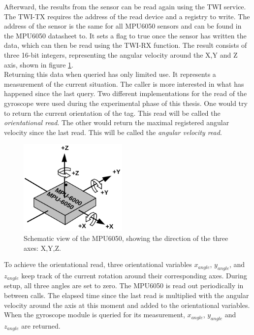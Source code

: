 Afterward, the results from the sensor can be read again using the TWI service.
The TWI-TX requires the address of the read device and a registry to write.
The address of the sensor is the same for all MPU6050 sensors and can be found in the MPU6050 datasheet to\cite{MPU6050}.
It sets a flag to true once the sensor has written the data, which can then be read using the TWI-RX function.
The result consists of three 16-bit integers, representing the angular velocity around the X,Y and Z axis, shown in figure \ref{f:MPU6050_orientation}.\\
Returning this data when queried has only limited use.
It represents a measurement of the current situation.
The caller is more interested in what has happened since the last query.
Two different implementations for the read of the gyroscope were used during the experimental phase of this thesis.
One would try to return the current orientation of the tag. This read will be called the \textit{orientational read}.
The other would return the maximal registered angular velocity since the last read. This will be called the \textit{angular velocity read}.


\begin{figure}[ht!]
\centering
\includegraphics[width=200px]{graphics/MPU6050_orientation.png}
\caption{Schematic view of the MPU6050, showing the direction of the three axes: X,Y,Z.}
\label{f:MPU6050_orientation}
\end{figure}



To achieve the orientational read, three orientational variables $x_{angle}$, $y_{angle}$, and $z_{angle}$ keep track of the current rotation around their corresponding axes.
During setup, all three angles are set to zero.
The MPU6050 is read out periodically in between calls.
The elapsed time since the last read is multiplied with the angular velocity around the axis at this moment and added to the orientational variables.
When the gyroscope module is queried for its measurement, $x_{angle}$, $y_{angle}$ and $z_{angle}$ are returned.



